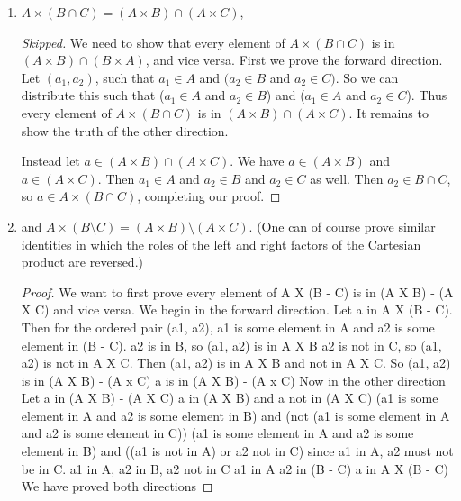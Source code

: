 \documentclass[../../main.tex]{subfiles}
\begin{document}
\begin{enumerate}
\begin{xx}
        \end{xx}    
        \item \begin{q}
$A \times (B \cap C) = (A \times B) \cap (A \times C)$,
        \end{q}    
        \begin{proof}
            [Skipped] We need to show  that every element of $A \times (B \cap C)$  is in $(A \times B) \cap (B \times A)$, and vice versa. First we prove the forward direction. Let $(a_1, a_2)$, such that $a_1 \in A$ and $( a_2 \in B$ and $a_2 \in C )$. So we can distribute this such that ($a_1 \in A $ and $a_2 \in B$) and ($a_1 \in A$ and $a_2 \in C$). Thus every element of $A \times (B \cap C)$ is in $(A \times B) \cap (A \times C)$. It remains to show the truth of the other direction. 
            
            Instead let $a \in (A \times B) \cap (A \times C)$. We have $a \in (A \times B)$ and $a \in (A \times C)$. Then $a_1 \in A$ and $a_2 \in B$ and $a_2 \in C$ as well. Then $a_2 \in B \cap C$, so $a \in A \times (B \cap C)$, completing our proof. 
        \end{proof}
        \begin{xx}
            
        \end{xx}      
        \item \begin{q}
            and $A \times (B\setminus C) = (A \times B)\setminus(A \times C)$. (One can of course prove similar identities in which the roles of the left and right factors of the Cartesian product are reversed.)
        \end{q}
        \begin{proof}
            We want to first prove every element of A X (B - C) is in (A X B) - (A X C) and vice versa. We begin in the forward direction. 
            Let a in A X (B - C). 
            Then for the ordered pair (a1, a2), a1 is some element in A and a2 is some element in (B - C).
            a2 is in B, so (a1, a2) is in A X B
            a2 is not in C, so (a1, a2) is not in A X C.
            Then (a1, a2) is in A X B and not in A X C.
            So (a1, a2) is in (A X B) - (A x C)
            a is in (A X B) - (A x C)
            Now in the other direction
            Let a in (A X B) - (A X C)
            a in (A X B) and a not in (A X C)
            (a1 is some element in A and a2 is some element in B) and (not (a1 is some element in A and a2 is some element in C))
            (a1 is some element in A and a2 is some element in B) and ((a1 is not in A) or a2 not in C)
            since a1 in A, a2 must not be in C.
            a1 in A, a2 in B, a2 not in C 
            a1 in A a2 in (B - C)
            a in A X (B - C)
            We have proved both directions
        \end{proof}    
    \end{enumerate}    
\end{document}
